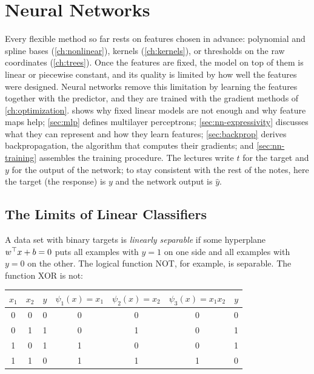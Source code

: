 \chapter{Neural Networks}\label{ch:nn}

Every flexible method so far rests on features chosen in advance: polynomial and spline bases (\cref{ch:nonlinear}), kernels (\cref{ch:kernels}), or thresholds on the raw coordinates (\cref{ch:trees}). Once the features are fixed, the model on top of them is linear or piecewise constant, and its quality is limited by how well the features were designed. Neural networks remove this limitation by learning the features together with the predictor, and they are trained with the gradient methods of \cref{ch:optimization}.  shows why fixed linear models are not enough and why feature maps help; \cref{sec:mlp} defines multilayer perceptrons; \cref{sec:nn-expressivity} discusses what they can represent and how they learn features; \cref{sec:backprop} derives backpropagation, the algorithm that computes their gradients; and \cref{sec:nn-training} assembles the training procedure. The lectures write $t$ for the target and $y$ for the output of the network; to stay consistent with the rest of the notes, here the target (the response) is $y$ and the network output is $\hat y$.

\section{The Limits of Linear Classifiers}\label{sec:nn-xor}

A data set with binary targets is \emph{linearly separable} if some hyperplane $w^{\top} x+b=0$ puts all examples with $y=1$ on one side and all examples with $y=0$ on the other. The logical function NOT, for example, is separable. The function XOR is not:

\begin{center}
\small
\begin{tabular}{@{}cc|c@{\qquad\qquad}ccc|c@{}}
\toprule
$x_1$ & $x_2$ & $y$ & $\psi_1(x)=x_1$ & $\psi_2(x)=x_2$ & $\psi_3(x)=x_1x_2$ & $y$ \\
\midrule
0 & 0 & 0 & 0 & 0 & 0 & 0 \\
0 & 1 & 1 & 0 & 1 & 0 & 1 \\
1 & 0 & 1 & 1 & 0 & 0 & 1 \\
1 & 1 & 0 & 1 & 1 & 1 & 0 \\
\bottomrule
\end{tabular}
\end{center}

